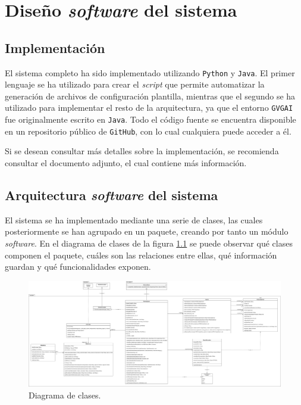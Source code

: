 
\chapter{Diseño \textit{software} del sistema}

\section{Implementación}

El sistema completo ha sido implementado utilizando \texttt{Python} y \texttt{Java}.
El primer lenguaje se ha utilizado para crear el \textit{script} que permite
automatizar la generación de archivos de configuración plantilla, mientras que el segundo
se ha utilizado para implementar el resto de la arquitectura, ya que el entorno
\texttt{GVGAI} fue originalmente escrito en \texttt{Java}. Todo el código fuente
se encuentra disponible en un repositorio público de \texttt{GitHub}, con lo cual
cualquiera puede acceder a él.

Si se desean consultar más detalles sobre la implementación, se recomienda consultar
el documento adjunto, el cual contiene más información.

\section{Arquitectura \textit{software} del sistema}

El sistema se ha implementado mediante una serie de clases, las cuales posteriormente
se han agrupado en un paquete, creando por tanto un módulo \textit{software}. En el diagrama
de clases de la figura \ref{fig:class_diagram} se puede observar qué clases componen
el paquete, cuáles son las relaciones entre ellas, qué información guardan y
qué funcionalidades exponen.

\begin{figure}[H]
    \centering
    \includegraphics[trim=0cm 0cm 50cm 0cm, clip=true, angle=90, origin=c, scale=0.28]{img/CH07/class_diagram.png}
    \caption{Diagrama de clases.}
    \label{fig:class_diagram}
\end{figure}

